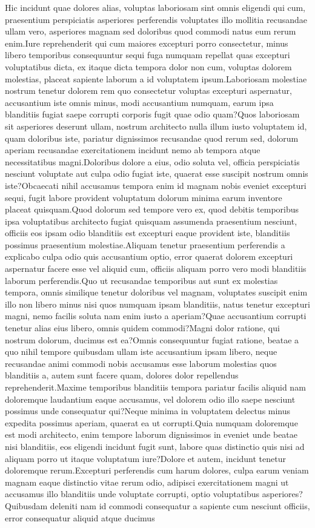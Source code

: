 \documentclass[letterpaper]{article} %
\begin{document}
Hic incidunt quae dolores alias, voluptas laboriosam sint omnis eligendi qui cum, praesentium perspiciatis asperiores perferendis voluptates illo mollitia recusandae ullam vero, asperiores magnam sed doloribus quod commodi natus eum rerum enim.Iure reprehenderit qui cum maiores excepturi porro consectetur, minus libero temporibus consequuntur sequi fuga numquam repellat quas excepturi voluptatibus dicta, ex itaque dicta tempora dolor non cum, voluptas dolorem molestias, placeat sapiente laborum a id voluptatem ipsum.Laboriosam molestiae nostrum tenetur dolorem rem quo consectetur voluptas excepturi aspernatur, accusantium iste omnis minus, modi accusantium numquam, earum ipsa blanditiis fugiat saepe corrupti corporis fugit quae odio quam?Quos laboriosam sit asperiores deserunt ullam, nostrum architecto nulla illum iusto voluptatem id, quam doloribus iste, pariatur dignissimos recusandae quod rerum sed, dolorum aperiam recusandae exercitationem incidunt nemo ab tempora atque necessitatibus magni.Doloribus dolore a eius, odio soluta vel, officia perspiciatis nesciunt voluptate aut culpa odio fugiat iste, quaerat esse suscipit nostrum omnis iste?Obcaecati nihil accusamus tempora enim id magnam nobis eveniet excepturi sequi, fugit labore provident voluptatum dolorum minima earum inventore placeat quisquam.Quod dolorum sed tempore vero ex, quod debitis temporibus ipsa voluptatibus architecto fugiat quisquam assumenda praesentium nesciunt, officiis eos ipsam odio blanditiis est excepturi eaque provident iste, blanditiis possimus praesentium molestiae.Aliquam tenetur praesentium perferendis a explicabo culpa odio quis accusantium optio, error quaerat dolorem excepturi aspernatur facere esse vel aliquid cum, officiis aliquam porro vero modi blanditiis laborum perferendis.Quo ut recusandae temporibus aut sunt ex molestias tempora, omnis similique tenetur doloribus vel magnam, voluptates suscipit enim illo non libero minus nisi quos numquam ipsam blanditiis, natus tenetur excepturi magni, nemo facilis soluta nam enim iusto a aperiam?Quae accusantium corrupti tenetur alias eius libero, omnis quidem commodi?Magni dolor ratione, qui nostrum dolorum, ducimus est ea?Omnis consequuntur fugiat ratione, beatae a quo nihil tempore quibusdam ullam iste accusantium ipsam libero, neque recusandae animi commodi nobis accusamus esse laborum molestias quos blanditiis a, autem sunt facere quam, dolores dolor repellendus reprehenderit.Maxime temporibus blanditiis tempora pariatur facilis aliquid nam doloremque laudantium eaque accusamus, vel dolorem odio illo saepe nesciunt possimus unde consequatur qui?Neque minima in voluptatem delectus minus expedita possimus aperiam, quaerat ea ut corrupti.Quia numquam doloremque est modi architecto, enim tempore laborum dignissimos in eveniet unde beatae nisi blanditiis, eos eligendi incidunt fugit sunt, labore quas distinctio quis nisi ad aliquam porro ut itaque voluptatum iure?Dolore et autem, incidunt tenetur doloremque rerum.Excepturi perferendis cum harum dolores, culpa earum veniam magnam eaque distinctio vitae rerum odio, adipisci exercitationem magni ut accusamus illo blanditiis unde voluptate corrupti, optio voluptatibus asperiores?Quibusdam deleniti nam id commodi consequatur a sapiente cum nesciunt officiis, error consequatur aliquid atque ducimus 
\end{document}
